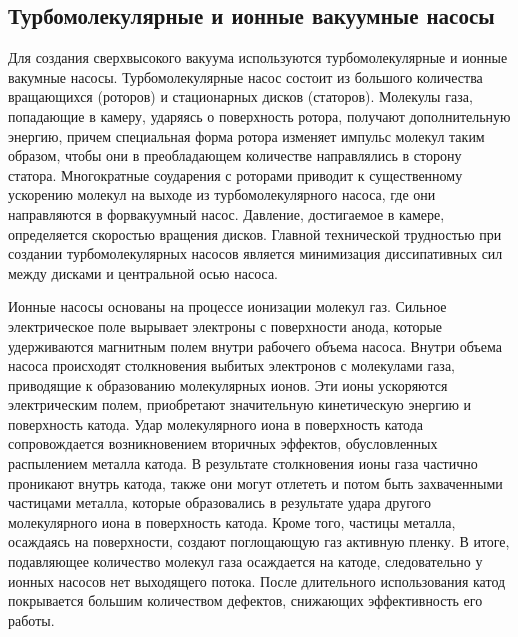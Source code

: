 \documentclass[12pt]{article}
\begin{document}
\subsection*{Турбомолекулярные и ионные вакуумные насосы}

Для создания сверхвысокого вакуума используются турбомолекулярные и ионные вакумные насосы. Турбомолекулярные насос состоит из большого количества вращающихся (роторов) и стационарных дисков (статоров). Молекулы газа, попадающие в камеру, ударяясь о поверхность ротора, получают дополнительную энергию, причем специальная форма ротора изменяет импульс молекул таким образом, чтобы они в преобладающем количестве направлялись в сторону статора. Многократные соударения с роторами приводит к существенному ускорению молекул на выходе из турбомолекулярного насоса, где они направляются в форвакуумный насос. Давление, достигаемое в камере, определяется скоростью вращения дисков. Главной технической трудностью при создании турбомолекулярных насосов является минимизация диссипативных сил между дисками и центральной осью насоса. \par 
Ионные насосы основаны на процессе ионизации молекул газ. Сильное электрическое поле вырывает электроны с поверхности анода, которые удерживаются магнитным полем внутри рабочего объема насоса. Внутри объема насоса происходят столкновения выбитых электронов с молекулами газа, приводящие к образованию молекулярных ионов. Эти ионы ускоряются электрическим полем, приобретают значительную кинетическую энергию и поверхность катода. Удар молекулярного иона в поверхность катода сопровождается возникновением вторичных эффектов, обусловленных распылением металла катода. В результате столкновения ионы газа частично проникают внутрь катода, также они могут отлететь и потом быть захваченными частицами металла, которые образовались в результате удара другого молекулярного иона в поверхность катода. Кроме того, частицы металла, осаждаясь на поверхности, создают поглощающую газ активную пленку. В итоге, подавляющее количество молекул газа осаждается на катоде, следовательно у ионных насосов нет выходящего потока. После длительного использования катод покрывается большим количеством дефектов, снижающих эффективность его работы.
\end{document}
